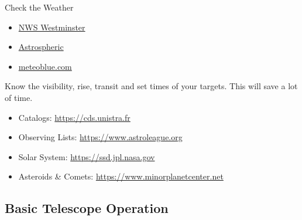 
\begin{frame}{Check the Weather}
  \Large
  \begin{itemize}
    \item \href{https://forecast.weather.gov/MapClick.php?lat=39.58&lon=-77.02}{NWS Westminster}
    \item \href{https://www.astrospheric.com/?Latitude=39.64723065543&Longitude=-76.986484788994&Loc=Forecast}{Astrospheric}
    \item \href{https://www.meteoblue.com/en/weather/week/westminster_united-states_4373238}{meteoblue.com}
  \end{itemize}
\end{frame}


\begin{frame}{\insertsubsectionhead}
  \Large
  Know the visibility, rise, transit and set times of your targets. This will save a lot of time.
  \begin{itemize}
    \item Catalogs: \href{https://cds.unistra.fr/}{https://cds.unistra.fr}
    \item Observing Lists: \href{https://www.astroleague.org/al/obsclubs/AlphabeticObservingClubs.html}{https://www.astroleague.org}
    \item Solar System: \href{https://ssd.jpl.nasa.gov/}{https://ssd.jpl.nasa.gov}
    \item Asteroids \& Comets: \href{https://www.minorplanetcenter.net/}{https://www.minorplanetcenter.net}
  \end{itemize}
\end{frame}

\subsection{Basic Telescope Operation}

